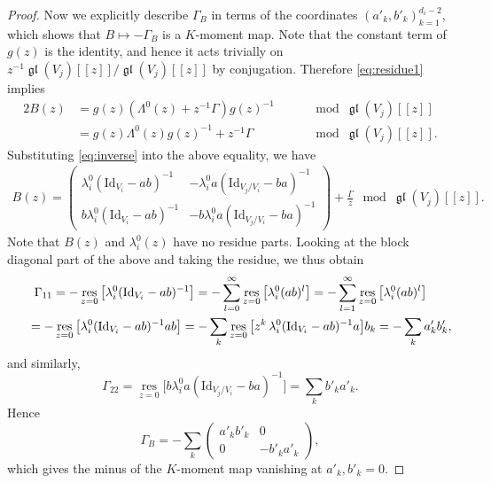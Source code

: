 \documentclass[pdftex]{sigma}
\numberwithin{equation}{section}
\theoremstyle{definition}
\newcommand{\C}{\mathbb{C}} %
\newcommand{\gl}{\operatorname{\mathfrak{gl}}}
\newcommand{\Hom}{\operatorname{Hom}}
\newcommand{\unit}{\mathrm{Id}}
\newcommand{\res}{\operatorname*{res}}
\begin{document}
\begin{proof}
Now we explicitly describe $\Gamma_B$ in terms of the coordinates
$(a'_k,b'_k)_{k=1}^{d_i-2}$,
which shows that $B \mapsto -\Gamma_B$ is a $K$-moment map.
Note that the constant term of $g(z)$ is the identity,
and hence it acts trivially on $z^{-1}\gl(V_j)[[z]]/\gl(V_j)[[z]]$
by conjugation.
Therefore \eqref{eq:residue1} implies
\begin{alignat*}{2}
B(z) &= g(z)(\Lambda^0(z) +z^{-1}\Gamma)g(z)^{-1}
&\quad &\mod \gl(V_j)[[z]] \\
&= g(z)\Lambda^0(z)g(z)^{-1} + z^{-1}\Gamma
&\quad &\mod \gl(V_j)[[z]].
\end{alignat*}
Substituting \eqref{eq:inverse} into the above equality,
we have
\begin{gather}\label{eq:depend}
B(z) =
\begin{pmatrix}
\lambda_i^0(\unit_{V_i}-ab)^{-1} &
-\lambda_i^0 a(\unit_{V_j/V_i}-ba)^{-1} \\
b\lambda_i^0(\unit_{V_i}-ab)^{-1} &
-b\lambda_i^0 a(\unit_{V_j/V_i}-ba)^{-1}
\end{pmatrix}
+ \frac{\Gamma}{z}
\mod \gl(V_j)[[z]].
\end{gather}
Note that $B(z)$ and $\lambda_i^0(z)$ have no residue parts.
Looking at the block diagonal part of the above and taking the residue,
we thus obtain
\begin{gather*}
\Gamma_{11}  = -\res_{z=0}\big[
\lambda_i^0(\unit_{V_i}-ab)^{-1} \big]
 = -\sum_{l=0}^\infty \res_{z=0}\big[
\lambda_i^0(ab)^l \big]
=-\sum_{l=1}^\infty \res_{z=0}\big[
\lambda_i^0(ab)^l \big] \\
\hphantom{\Gamma_{11}}{}
=-\res_{z=0}\big[
\lambda_i^0(\unit_{V_i}-ab)^{-1}ab \big]
=-\sum_k \res_{z=0}\big[ z^k\,
\lambda_i^0(\unit_{V_i}-ab)^{-1}a \big] b_k
= -\sum_k a'_k b'_k,
\end{gather*}
and similarly,
\[
\Gamma_{22} = \res_{z=0}\big[
b\lambda_i^0 a(\unit_{V_j/V_i}-ba)^{-1}\big]
= \sum_k b'_k a'_k.
\]
Hence
\[
\Gamma_B = -\sum_k
\begin{pmatrix}
a'_k b'_k & 0 \\ 0 & -b'_k a'_k
\end{pmatrix},
\]
which gives the minus of the $K$-moment map vanishing at
$a'_k,b'_k=0$.
\end{proof}
\end{document}
